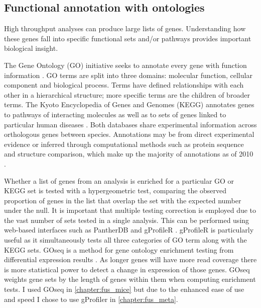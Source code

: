 \subsection{Functional annotation with ontologies}

High throughput analyses can produce large lists of genes.
Understanding how these genes fall into specific functional sets and/or pathways provides important biological insight.

The Gene Ontology (GO) initiative seeks to annotate every gene with function information \citep{Ashburner2000,Carbon2017}.
GO terms are split into three domains: molecular function, cellular component and biological process. 
Terms have defined relationships with each other in a hierarchical structure; more specific terms are the children of broader terms.
The Kyoto Encyclopedia of Genes and Genomes (KEGG) annotates genes to pathways of interacting molecules as well as to sets of genes linked to particular human diseases \citep{Ogata1999}.
Both databases share experimental information across orthologous genes between species.
Annotations may be from direct experimental evidence or inferred through computational methods such as protein sequence and structure comparison, which make up the majority of annotations as of 2010 \citep{DuPlessis2011}.

Whether a list of genes from an analysis is enriched for a particular GO or KEGG set is tested with a hypergeometric test, comparing the observed proportion of genes in the list that overlap the set with the expected number under the null.
It is important that multiple testing correction is employed due to the vast number of sets tested in a single analysis.
This can be performed using web-based interfaces such as PantherDB \citep{Thomas2003} and gProfileR \citep{Reimand2016}.
gProfileR is particularly useful as it simultaneously tests all three categories of GO term along with the KEGG sets.
GOseq is a method for gene ontology enrichment testing from differential expression results \citep{Young2010}. As longer genes will have more read coverage there is more statistical power to detect a change in expression of those genes. GOseq weights gene sets by the length of genes within them when computing enrichment tests. I used GOseq in \autoref{chapter:fus_mice} but due to the enhanced ease of use and speed I chose to use gProfiler in \autoref{chapter:fus_meta}.

